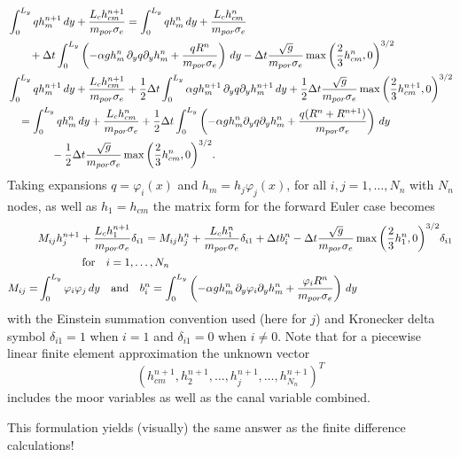 \documentclass [12pt,english]{article}
\def\frac#1#2{ {#1\over#2}}
\begin{document}
\begin{align}
&\int_0^{L_y}  q h_m^{n+1}\, d y +\frac {L_c h_{cm}^{n+1}}{m_{por}\sigma_e} = \int_0^{L_y} q h_m^{n}\, dy+\frac {L_c h_{cm}^{n}}{m_{por}\sigma_e}\nonumber\\
&\qquad +\Delta t \int_0^{L_y} \left(-\alpha g h_m^n \, \partial_y q \partial_y h_m^n+\frac {q R^n}{m_{por} \sigma_e}\right)\, dy
-\Delta t \frac {\sqrt{g}}{m_{por}\sigma_e} \max{\left(\frac 23 h^n_{cm},0\right)}^{3/2} \\
%
%
& \int_0^{L_y}  q h_m^{n+1}\, d y +\frac {L_c h_{cm}^{n+1}}{m_{por}\sigma_e}
+\frac 12\Delta t \int_0^{L_y}\alpha g h_m^{n+1} \,\partial_y q \partial_y h_m^{n+1}\, dy
+\frac 12\Delta t \frac {\sqrt{g}}{m_{por}\sigma_e} \max{\left(\frac 23 h^{n+1}_{cm},0\right)}^{3/2}
\nonumber\\
&\quad = \int_0^{L_y} q h_m^{n}\, dy+\frac {L_c h_{cm}^{n}}{m_{por}\sigma_e}
+\frac 12\Delta t\int_0^{L_y}\left(-\alpha g h_m^n \partial_y q \partial_y h_m^n + \frac {q (R^n+R^{n+1})}{m_{por} \sigma_e}
\right)\, dy\nonumber\\
&\qquad\qquad -\frac 12\Delta t \frac {\sqrt{g}}{m_{por}\sigma_e} \max{\left(\frac 23 h^n_{cm},0\right)}^{3/2}.
\end{align}
Taking expansions $q=\varphi_i(x)$ and $h_m=h_j\varphi_j(x)$, for all $i,j=1,\dots,N_n$ with $N_n$ nodes, as well as $h_1=h_{cm}$
the matrix form for the forward Euler case becomes
\begin{align}
& M_{ij} h_{j}^{n+1}+\frac {L_c h_{1}^{n+1}}{m_{por}\sigma_e}\delta_{i1} = M_{ij} h_j^{n}+\frac {L_c h_{1}^{n}}{m_{por}\sigma_e}\delta_{i1}+\Delta t b_{i}^n
  -\Delta t \frac {\sqrt{g}}{m_{por}\sigma_e} \max{\left(\frac 23 h^n_{1},0\right)}^{3/2}\delta_{i1}\nonumber\\
  & \qquad\qquad \textrm{for}\quad i=1,\dots,N_n\\
M_{ij} = & \int_0^{L_y} \varphi_i\varphi_j  \, dy\quad\textrm{and}\quad
b_{i}^n = \int_0^{L_y} \left(-\alpha g h_m^n \, \partial_y \varphi_{i} \partial_y h_m^n
+\frac {\varphi_i R^n}{m_{por} \sigma_e}\right)\, dy
\end{align}
with the Einstein summation convention used (here for $j$) and Kronecker delta symbol $\delta_{i1}=1$ when $i=1$ and $\delta_{i1}=0$ when $i\ne 0$.
Note that for a piecewise linear finite element approximation the unknown vector
$$(h_{cm}^{n+1},h_2^{n+1},\dots,h_j^{n+1},\dots,h_{N_n}^{n+1})^T$$
includes the moor variables as well as the canal variable combined.

This formulation yields (visually) the same answer as the finite difference calculations!
\end{document}
